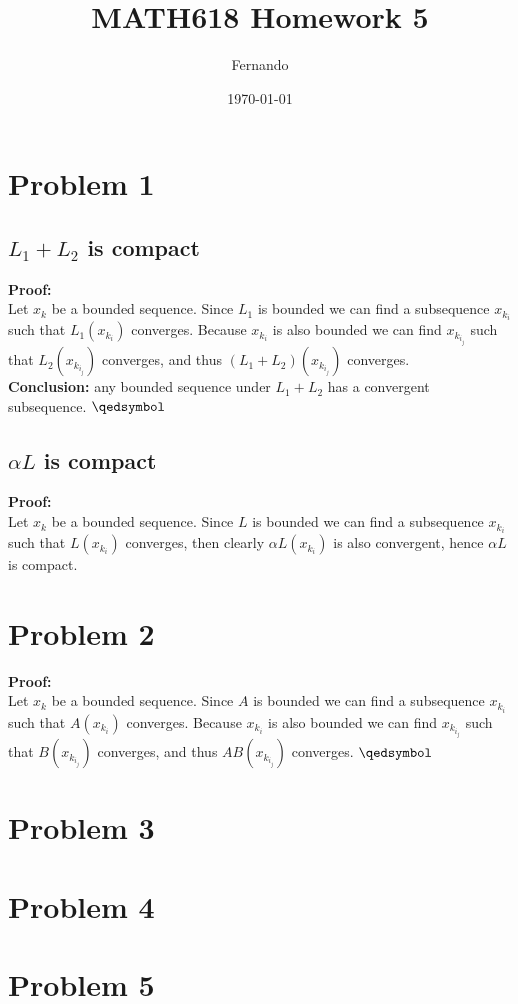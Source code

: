 \documentclass[12pt]{article}%
\begin{document}
\title{MATH618 Homework 5}
\author{Fernando}
\date{\today}
\maketitle
\section*{Problem 1}
\subsection*{$L_1+L_2$ is compact}
\textbf{Proof:}\\
Let $x_k$ be a bounded sequence. Since $L_1$ is bounded we can find a
subsequence $x_{k_i}$ such that $L_1(x_{k_i})$ converges. Because $x_{k_i}$ is
also bounded we can find $x_{k_{i_j}}$ such that $L_2(x_{k_{i_j}})$ converges,
and thus $(L_1+L_2)(x_{k_{i_j}})$ converges.\\
\textbf{Conclusion:} any bounded sequence under $L_1+L_2$
has a convergent subsequence. $\qedsymbol$
\subsection*{$\alpha L$ is compact}
\textbf{Proof:}\\
Let $x_k$ be a bounded sequence. Since $L$ is bounded we can find a subsequence
$x_{k_i}$ such that $L(x_{k_i})$ converges, then clearly $\alpha
L(x_{k_i})$ is also convergent, hence $\alpha L$ is compact.
\section*{Problem 2}
\textbf{Proof:}\\
Let $x_k$ be a bounded sequence. Since $A$ is bounded we can find a
subsequence $x_{k_i}$ such that $A(x_{k_i})$ converges. Because $x_{k_i}$ is
also bounded we can find $x_{k_{i_j}}$ such that $B(x_{k_{i_j}})$ converges,
and thus $AB(x_{k_{i_j}})$ converges. $\qedsymbol$
\section*{Problem 3}
\section*{Problem 4}
\section*{Problem 5}
\end{document}
